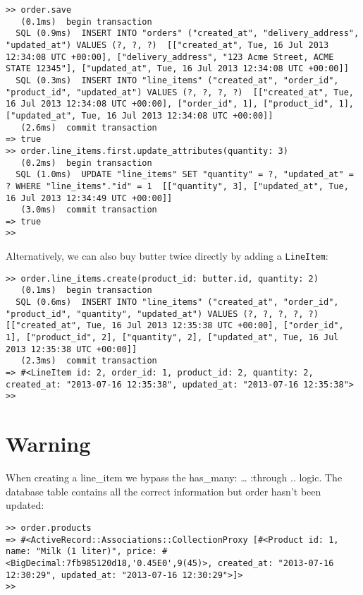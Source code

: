 \documentclass[a4paper]{book}
\newcounter{tab}[chapter]
\begin{document}
\begin{shaded}\begin{verbatim}
>> order.save
   (0.1ms)  begin transaction
  SQL (0.9ms)  INSERT INTO "orders" ("created_at", "delivery_address", "updated_at") VALUES (?, ?, ?)  [["created_at", Tue, 16 Jul 2013 12:34:08 UTC +00:00], ["delivery_address", "123 Acme Street, ACME STATE 12345"], ["updated_at", Tue, 16 Jul 2013 12:34:08 UTC +00:00]]
  SQL (0.3ms)  INSERT INTO "line_items" ("created_at", "order_id", "product_id", "updated_at") VALUES (?, ?, ?, ?)  [["created_at", Tue, 16 Jul 2013 12:34:08 UTC +00:00], ["order_id", 1], ["product_id", 1], ["updated_at", Tue, 16 Jul 2013 12:34:08 UTC +00:00]]
   (2.6ms)  commit transaction
=> true
>> order.line_items.first.update_attributes(quantity: 3)
   (0.2ms)  begin transaction
  SQL (1.0ms)  UPDATE "line_items" SET "quantity" = ?, "updated_at" = ? WHERE "line_items"."id" = 1  [["quantity", 3], ["updated_at", Tue, 16 Jul 2013 12:34:49 UTC +00:00]]
   (3.0ms)  commit transaction
=> true
>>
\end{verbatim}\end{shaded}

Alternatively, we can also buy butter twice directly by adding a \texttt{LineItem}:

\begin{shaded}\begin{verbatim}
>> order.line_items.create(product_id: butter.id, quantity: 2)
   (0.1ms)  begin transaction
  SQL (0.6ms)  INSERT INTO "line_items" ("created_at", "order_id", "product_id", "quantity", "updated_at") VALUES (?, ?, ?, ?, ?)  [["created_at", Tue, 16 Jul 2013 12:35:38 UTC +00:00], ["order_id", 1], ["product_id", 2], ["quantity", 2], ["updated_at", Tue, 16 Jul 2013 12:35:38 UTC +00:00]]
   (2.3ms)  commit transaction
=> #<LineItem id: 2, order_id: 1, product_id: 2, quantity: 2, created_at: "2013-07-16 12:35:38", updated_at: "2013-07-16 12:35:38">
>>
\end{verbatim}\end{shaded}

\section{Warning}\label{warning-3}

When creating a line\_item we bypass the has\_many: \ldots{} :through .. logic. The database table contains all the correct information but order hasn't been updated:

\begin{shaded}\begin{verbatim}
>> order.products
=> #<ActiveRecord::Associations::CollectionProxy [#<Product id: 1, name: "Milk (1 liter)", price: #<BigDecimal:7fb985120d18,'0.45E0',9(45)>, created_at: "2013-07-16 12:30:29", updated_at: "2013-07-16 12:30:29">]>
>>
\end{verbatim}\end{shaded}
\end{document}

